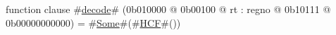 function clause #\hyperref[zdecode]{decode}# (0b010000 @ 0b00100 @ rt : regno @ 0b10111 @ 0b00000000000) =
  #\hyperref[zSome]{Some}#(#\hyperref[zHCF]{HCF}#())
